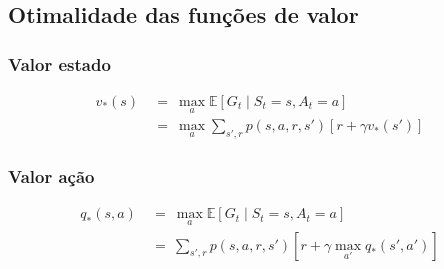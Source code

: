 \documentclass{article}
\begin{document}
        \subsection{Otimalidade das funções de valor}
        
            \subsubsection{Valor estado}
            
                \begin{equation}
                \begin{split}
                    v_*(s) & \ = \ \max_{a} \mathbb{E}[G_t \mid S_t = s, A_t = a] \\
                    & \ = \ \max_{a} \sum_{s', r} p(s, a, r, s') [r + \gamma v_*(s')]
                \end{split}
                \end{equation}
            
            \subsubsection{Valor ação}
            
                \begin{equation}
                \begin{split}
                    q_*(s, a) & \ = \ \max_{a} \mathbb{E}[G_t \mid S_t = s, A_t = a] \\
                    & \ = \ \sum_{s', r} p(s, a, r, s') [r + \gamma \max_{a'} q_*(s', a')]
                \end{split}
                \end{equation}
\end{document}
